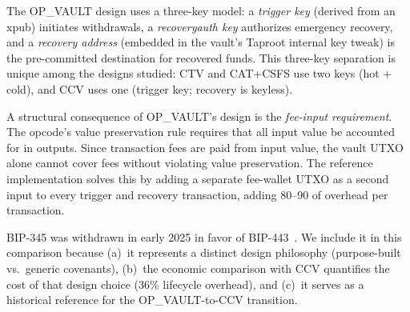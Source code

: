 The OP\_VAULT design uses a three-key model: a \emph{trigger key} (derived from an xpub)
initiates withdrawals, a \emph{recoveryauth key} authorizes emergency recovery, and a
\emph{recovery address} (embedded in the vault's Taproot internal key tweak) is the
pre-committed destination for recovered funds. This three-key separation is unique among
the designs studied: CTV and CAT+CSFS use two keys (hot + cold), and CCV uses one
(trigger key; recovery is keyless).

A structural consequence of OP\_VAULT's design is the \emph{fee-input requirement}. The
opcode's value preservation rule requires that all input value be accounted for in
outputs. Since transaction fees are paid from input value, the vault UTXO alone cannot
cover fees without violating value preservation. The reference implementation solves this
by adding a separate fee-wallet UTXO as a second input to every trigger and recovery
transaction, adding 80--90\vB{} of overhead per transaction.

BIP-345 was withdrawn in early 2025 in favor of BIP-443~\cite{OB25}. We include it in
this comparison because (a)~it represents a distinct design philosophy (purpose-built
vs.\ generic covenants), (b)~the economic comparison with CCV quantifies the cost of
that design choice (36\% lifecycle overhead), and (c)~it serves as a historical reference
for the OP\_VAULT-to-CCV transition.

